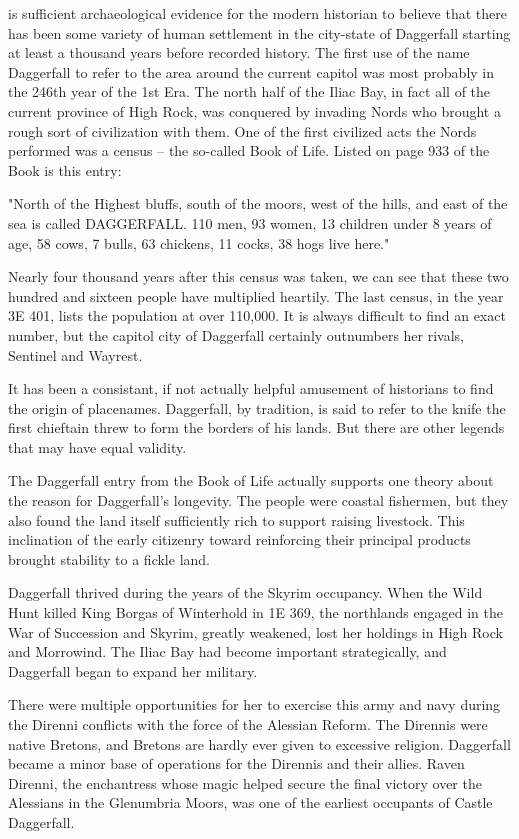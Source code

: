 
 is sufficient archaeological evidence for the modern historian to believe that there has been some variety of human settlement in the city-state of Daggerfall starting at least a thousand years before recorded history. The first use of the name Daggerfall to refer to the area around the current capitol was most probably in the 246th year of the 1st Era. The north half of the Iliac Bay, in fact all of the current province of High Rock, was conquered by invading Nords who brought a rough sort of civilization with them. One of the first civilized acts the Nords performed was a census -- the so-called Book of Life. Listed on page 933 of the Book is this entry:

"North of the Highest bluffs, south of the moors, west of the hills, and east of the sea is called DAGGERFALL. 110 men, 93 women, 13 children under 8 years of age, 58 cows, 7 bulls, 63 chickens, 11 cocks, 38 hogs live here."

Nearly four thousand years after this census was taken, we can see that these two hundred and sixteen people have multiplied heartily. The last census, in the year 3E 401, lists the population at over 110,000. It is always difficult to find an exact number, but the capitol city of Daggerfall certainly outnumbers her rivals, Sentinel and Wayrest.

It has been a consistant, if not actually helpful amusement of historians to find the origin of placenames. Daggerfall, by tradition, is said to refer to the knife the first chieftain threw to form the borders of his lands. But there are other legends that may have equal validity.

The Daggerfall entry from the Book of Life actually supports one theory about the reason for Daggerfall's longevity. The people were coastal fishermen, but they also found the land itself sufficiently rich to support raising livestock. This inclination of the early citizenry toward reinforcing their principal products brought stability to a fickle land.

Daggerfall thrived during the years of the Skyrim occupancy. When the Wild Hunt killed King Borgas of Winterhold in 1E 369, the northlands engaged in the War of Succession and Skyrim, greatly weakened, lost her holdings in High Rock and Morrowind. The Iliac Bay had become important strategically, and Daggerfall began to expand her military.

There were multiple opportunities for her to exercise this army and navy during the Direnni conflicts with the force of the Alessian Reform. The Dirennis were native Bretons, and Bretons are hardly ever given to excessive religion. Daggerfall became a minor base of operations for the Dirennis and their allies. Raven Direnni, the enchantress whose magic helped secure the final victory over the Alessians in the Glenumbria Moors, was one of the earliest occupants of Castle Daggerfall.

